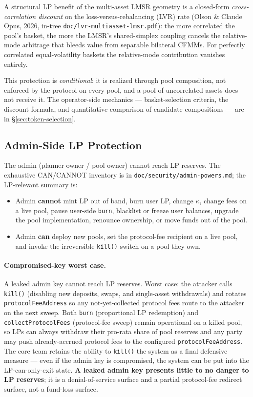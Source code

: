 \documentclass[11pt]{article}
\begin{document}
A structural LP benefit of the multi-asset LMSR geometry is a closed-form
\emph{cross-correlation discount} on the loss-versus-rebalancing (LVR)
rate (Olson \& Claude Opus, 2026, in-tree
\texttt{doc/lvr-multiasset-lmsr.pdf}): the more correlated the pool's
basket, the more the LMSR's shared-simplex coupling cancels the
relative-mode arbitrage that bleeds value from separable bilateral
CFMMs. For perfectly correlated equal-volatility baskets the
relative-mode contribution vanishes entirely.

This protection is \emph{conditional}: it is realized through pool
composition, not enforced by the protocol on every pool, and a pool of
uncorrelated assets does not receive it. The operator-side mechanics ---
basket-selection criteria, the discount formula, and quantitative
comparison of candidate compositions --- are in \S\ref{sec:token-selection}.

\subsection{Admin-Side LP Protection}
\label{sec:admin-risk}

The admin (planner owner / pool owner) cannot reach LP reserves. The
exhaustive CAN/CANNOT inventory is in \texttt{doc/security/admin-powers.md};
the LP-relevant summary is:

\begin{itemize}
  \item Admin \textbf{cannot} mint LP out of band, burn user LP, change
        $\kappa$, change fees on a live pool, pause user-side
        \texttt{burn}, blacklist or freeze user balances, upgrade the pool
        implementation, renounce ownership, or move funds out of the pool.
  \item Admin \textbf{can} deploy new pools, set the protocol-fee recipient
        on a live pool, and invoke the irreversible \texttt{kill()} switch
        on a pool they own.
\end{itemize}

\paragraph{Compromised-key worst case.}
A leaked admin key cannot reach LP reserves. Worst case: the attacker
calls \texttt{kill()} (disabling new deposits, swaps, and single-asset
withdrawals) and rotates \texttt{protocolFeeAddress} so any
not-yet-collected protocol fees route to the attacker on the next sweep.
Both \texttt{burn} (proportional LP redemption) and
\texttt{collectProtocolFees} (protocol-fee sweep) remain operational on a
killed pool, so LPs can always withdraw their pro-rata share of pool
reserves and any party may push already-accrued protocol fees to the
configured \texttt{protocolFeeAddress}. The core team retains the ability
to \texttt{kill()} the system as a final defensive measure --- even if the
admin key is compromised, the system can be put into the LP-can-only-exit
state. \textbf{A leaked admin key presents little to no danger to LP
reserves}; it is a denial-of-service surface and a partial protocol-fee
redirect surface, not a fund-loss surface.
\end{document}
